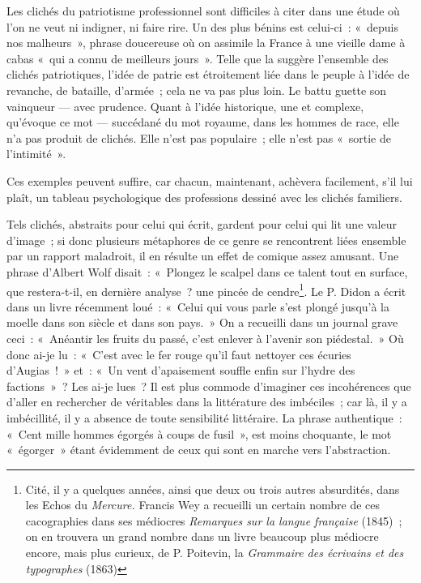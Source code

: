 \documentclass[french,twoside]{book} %
\begin{document}
Les clichés du patriotisme professionnel sont difficiles à citer dans une étude où l’on ne veut ni indigner, ni faire rire. Un des plus bénins est celui-ci : « depuis nos malheurs », phrase doucereuse où on assimile la France à une vieille dame à cabas « qui a connu de meilleurs jours ». Telle que la suggère l’ensemble des clichés patriotiques, l’idée de patrie est étroitement liée dans le peuple à l’idée de revanche, de bataille, d’armée ; cela ne va pas plus loin. Le battu guette son vainqueur — avec prudence. Quant à l’idée historique, une et complexe, qu’évoque ce mot — succédané du mot royaume, dans les hommes de race, elle n’a pas produit de clichés. Elle n’est pas populaire ; elle n’est pas « sortie de l’intimité ».\par
Ces exemples peuvent suffire, car chacun, maintenant, achèvera facilement, s’il lui plaît, un tableau psychologique des professions dessiné avec les clichés familiers.\par
Tels clichés, abstraits pour celui qui écrit, gardent pour celui qui lit une valeur d’image ; si donc plusieurs métaphores de ce genre se rencontrent liées ensemble par un rapport maladroit, il en résulte un effet de comique assez amusant. Une phrase d’Albert Wolf disait : « Plongez le scalpel dans ce talent tout en surface, que restera-t-il, en dernière analyse ? une pincée de cendre\footnote{ Cité, il y a quelques années, ainsi que deux ou trois autres absurdités, dans les Echos du {\itshape Mercure.} Francis Wey a recueilli un certain nombre de ces cacographies dans ses médiocres {\itshape Remarques sur la langue française} (1845) ; on en trouvera un grand nombre dans un livre beaucoup plus médiocre encore, mais plus curieux, de P. Poitevin, la {\itshape Grammaire des écrivains et des typographes} (1863)}. Le P. Didon a écrit dans un livre récemment loué : « Celui qui vous parle s’est plongé jusqu’à la moelle dans son siècle et dans son pays. » On a recueilli dans un journal grave ceci : « Anéantir les fruits du passé, c’est enlever à l’avenir son piédestal. » Où donc ai-je lu : « C’est avec le fer rouge qu’il faut nettoyer ces écuries d’Augias ! » et : « Un vent d’apaisement souffle enfin sur l’hydre des factions » ? Les ai-je lues ? Il est plus commode d’imaginer ces incohérences que d’aller en rechercher de véritables dans la littérature des imbéciles ; car là, il y a imbécillité, il y a absence de toute sensibilité littéraire. La phrase authentique : « Cent mille hommes égorgés à coups de fusil », est moins choquante, le mot « égorger » étant évidemment de ceux qui sont en marche vers l’abstraction.\par
\end{document}
